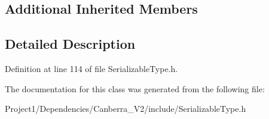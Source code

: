 \subsection*{Additional Inherited Members}


\subsection{Detailed Description}


Definition at line 114 of file Serializable\+Type.\+h.



The documentation for this class was generated from the following file\+:\begin{DoxyCompactItemize}
\item 
Project1/\+Dependencies/\+Canberra\+\_\+\+V2/include/Serializable\+Type.\+h\end{DoxyCompactItemize}
